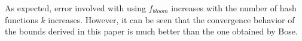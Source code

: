 As expected, error involved with using $f_{bloom}$ increases with the number of hash functions $k$ increases. 
%
However, it can be seen that the convergence behavior of the bounds derived in this paper is much better than the one obtained by Bose. 

\begin{comment}
The calculation of the correct rate of the counting Bloom filter \cite{cbf}, $\mathcal{C}_r$, can benefit from our derivation about the false positive probability of standard Bloom filter. 
%
The counting Bloom filter (CBF), one variant of standard Bloom filter, replaces each bit with one counter, supporting estimating the frequency of each inserted item. 
%
In CBF, the over-estimation of an inserted item is equivalent to one false positive in standard Bloom filter. 
%
Therefore, we have: 
\begin{equation}
\mathcal{C}_r = 1 - f_{true}
\end{equation}
%
Applying equation \ref{bounds}, we can get the upper and lower bounds of the $\mathcal{C}_r$ of CBF. 
\end{comment}
